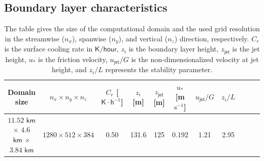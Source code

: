 \documentclass[%
 aip,
 amsmath,amssymb,
preprint,%
author-numerical,%
]{revtex4-1}
\begin{document}
\subsection{Boundary layer characteristics}\label{sec2.3} 
\begin{table} 
 \begin{center}
 \caption{The table gives the size of the computational domain and the used grid resolution in the streamwise ($n_x$), spanwise ($n_y$), and vertical ($n_z$) direction, respectively. $C_r$ is the surface cooling rate in $\mathsf{K/hour}$, $z_i$ is the boundary layer height, $z_\mathsf{jet}$ is the jet height, $u_*$ is the friction velocity, $u_\mathsf{jet}/G$ is the non-dimensionalized velocity at jet height, and $z_i/L$ represents the stability parameter.}
 \begin{tabular}{|c|c|c|c|c|c|c|c|c|c|c|}
 \hline
 Domain size & $n_x \times n_y \times n_z$ & $C_r$ [$\mathsf{K}\cdot\mathsf{h}^{-1}$] & $z_i$ [m] & $z_\mathsf{jet}$ [m] & $u_*$ [m$\text{s}^{-1}$]& $u_\mathsf{jet}/G$ & $z_i/L$ \\[3pt]
 \hline
$11.52$ $\mathsf{km}$ $\times$ $4.6$ $\mathsf{km}$ $\times$ $3.84$ $\mathsf{km}$ & $1280\times512\times384$& 0.50 & 131.6 & 125 & 0.192 & 1.21 & 2.95\\
\hline
 \end{tabular}
\label{table1}
\end{center}
\end{table}
\end{document}
